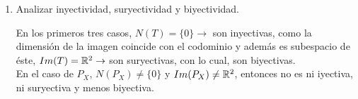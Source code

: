 \begin{enumerate}
        \item Analizar inyectividad, suryectividad y biyectividad.
            \begin{mdframed}[style=s]
                En los primeros tres casos, $N(T)=\{0\}\to$ son inyectivas, como la dimensión de la imagen coincide con el codominio y además es subespacio de éste, $Im(T)=\mathbb{R}^2\to $ son suryectivas, con lo cual, son biyectivas.\\
                En el caso de $P_X$, $N(P_X)\neq \{0\}$ y $Im(P_X)\neq \mathbb{R}^2$, entonces no es ni iyectiva, ni suryectiva y menos biyectiva.
            \end{mdframed}
    \end{enumerate}